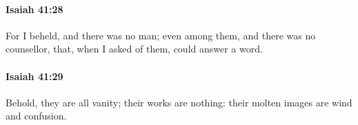		\paragraph{Isaiah 41:28} %
			\label{ISAIAH-41-28}

			For I beheld, and there was no man; even among them, and there was no counsellor, that, when I asked of them, could answer a word.


		\paragraph{Isaiah 41:29} %
			\label{ISAIAH-41-29}

			Behold, they are all vanity; their works are nothing: their molten images are wind and confusion.

